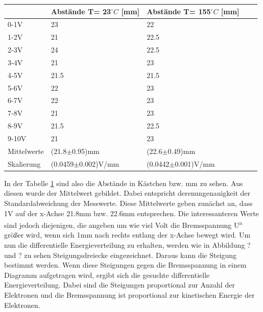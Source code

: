 \begin{minipage}{\linewidth}
    \begin{table}[H]
        \centering
    
    \begin{tabular}{lllll}
        \toprule
         & Abstände T= 23$^\circ C$ [mm] & Abstände T= 155$^\circ C$ [mm]\\
        \midrule
        0-1V  & 23 & 22     \\
        1-2V  & 21 & 22.5   \\
        2-3V  & 24 & 22.5   \\
        3-4V  & 21 & 23     \\
        4-5V  & 21.5 & 21.5 \\
        5-6V  & 22 & 23     \\
        6-7V  & 22 & 23     \\
        7-8V  & 21 & 23     \\
        8-9V  & 21.5 & 22.5 \\
        9-10V & 21 & 23     \\
        \midrule
        Mittelwerte & (21.8$\pm$0.95)mm & (22.6$\pm$0.49)mm \\
        Skalierung & (0.0459$\pm$0.002)V/mm & (0.0442$\pm$0.001)V/mm \\
        \bottomrule
        
    \end{tabular}
    \label{tab:1}
    \end{table}
    \end{minipage}

\noindent In der Tabelle \ref{tab:1} sind also die Abstände in Kästchen bzw. mm zu sehen. Aus diesen wurde der Mittelwert gebildet. Dabei entspricht derenungenauigkeit der Standardabweichung der Messwerte. Diese Mittelwerte geben zunächst an, dass 1V auf der x-Achse 21.8mm bzw. 22.6mm entsprechen. Die interessanteren Werte sind jedoch diejenigen, die angeben um wie viel Volt die Bremsspannung U\textsuperscript{a} größer wird, wenn sich 1mm nach rechts entlang der x-Achse bewegt wird. 
\noindent Um nun die differentielle Energieverteilung zu erhalten, werden wie in Abbildung ? und ? zu sehen Steigungsdreiecke eingezeichnet. Daraus kann die Steigung bestimmt werden. Wenn diese Steigungen gegen die Bremsspannung in einem Diagramm aufgetragen wird, ergibt sich die gesuchte differentielle Energieverteilung. Dabei sind die Steigungen proportional zur Anzahl der Elektronen und die Bremsspannung ist proportional zur kinetischen Energie der Elektronen. 

